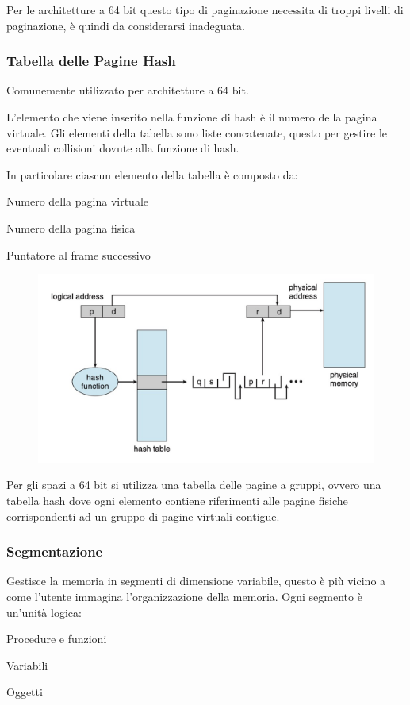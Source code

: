 Per le architetture a 64 bit questo tipo di paginazione necessita di troppi livelli di paginazione, è quindi da considerarsi inadeguata.

\subsubsection*{Tabella delle Pagine Hash}
Comunemente utilizzato per architetture a 64 bit.

L'elemento che viene inserito nella funzione di hash è il numero della pagina virtuale. Gli elementi della tabella sono liste concatenate, questo per gestire le eventuali collisioni dovute alla funzione di hash.

\spacer

In particolare ciascun elemento della tabella è composto da:
\begin{sitemize}
    \item Numero della pagina virtuale
    \item Numero della pagina fisica
    \item Puntatore al frame successivo
\end{sitemize}

\begin{figure}[H]
    \centering
    \includegraphics[width=0.5\linewidth]{assets/hashed-page-table.jpg}
\end{figure}

\begin{note}
    Per gli spazi a 64 bit si utilizza una tabella delle pagine a gruppi, ovvero una tabella hash dove ogni elemento contiene riferimenti alle pagine fisiche corrispondenti ad un gruppo di pagine virtuali contigue.
\end{note}

\subsubsection*{Segmentazione}
Gestisce la memoria in segmenti di dimensione variabile, questo è più vicino a come l'utente immagina l'organizzazione della memoria. Ogni segmento è un'unità logica:
\begin{sitemize}
    \item Procedure e funzioni
    \item Variabili
    \item Oggetti
\end{sitemize}

